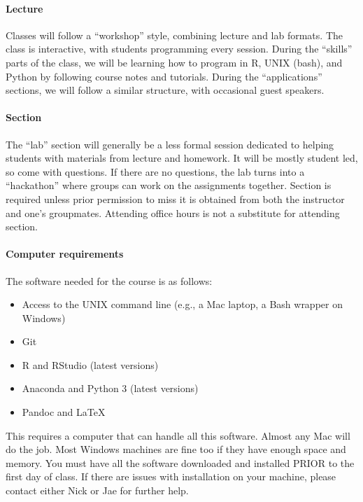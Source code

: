 \documentclass[
]{article}
\providecommand{\tightlist}{%
  \setlength{\itemsep}{0pt}\setlength{\parskip}{0pt}}
\begin{document}
\hypertarget{lecture}{%
\paragraph{Lecture}\label{lecture}}

Classes will follow a ``workshop'' style, combining lecture and lab
formats. The class is interactive, with students programming every
session. During the ``skills'' parts of the class, we will be learning
how to program in R, UNIX (bash), and Python by following course notes
and tutorials. During the ``applications'' sections, we will follow a
similar structure, with occasional guest speakers.

\hypertarget{section}{%
\paragraph{Section}\label{section}}

The ``lab'' section will generally be a less formal session dedicated to
helping students with materials from lecture and homework. It will be
mostly student led, so come with questions. If there are no questions,
the lab turns into a ``hackathon'' where groups can work on the
assignments together. Section is required unless prior permission to
miss it is obtained from both the instructor and one's groupmates.
Attending office hours is not a substitute for attending section.

\hypertarget{computer-requirements}{%
\paragraph{Computer requirements}\label{computer-requirements}}

The software needed for the course is as follows:

\begin{itemize}
\tightlist
\item
  Access to the UNIX command line (e.g., a Mac laptop, a Bash wrapper on
  Windows)
\item
  Git
\item
  R and RStudio (latest versions)
\item
  Anaconda and Python 3 (latest versions)
\item
  Pandoc and LaTeX
\end{itemize}

This requires a computer that can handle all this software. Almost any
Mac will do the job. Most Windows machines are fine too if they have
enough space and memory. You must have all the software downloaded and
installed PRIOR to the first day of class. If there are issues with
installation on your machine, please contact either Nick or Jae for
further help.
\end{document}
